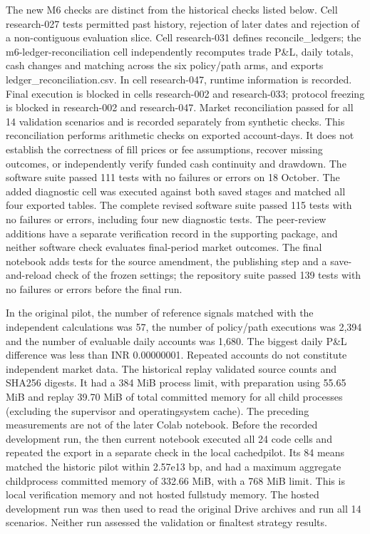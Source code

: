 \documentclass[11pt,a4paper]{article}
\begin{document}
The new M6 checks are distinct from the historical checks listed below. Cell research-027 tests permitted past history, rejection of later dates and rejection of a non-contiguous evaluation slice. Cell research-031 defines reconcile\_ledgers; the m6-ledger-reconciliation cell independently recomputes trade P\&L, daily totals, cash changes and matching across the six policy/path arms, and exports ledger\_reconciliation.csv. In cell research-047, runtime information is recorded. Final execution is blocked in cells research-002 and research-033; protocol freezing is blocked in research-002 and research-047. Market reconciliation passed for all 14 validation scenarios and is recorded separately from synthetic checks. This reconciliation performs arithmetic checks on exported account-days. It does not establish the correctness of fill prices or fee assumptions, recover missing outcomes, or independently verify funded cash continuity and drawdown. The software suite passed 111 tests with no failures or errors on 18 October. The added diagnostic cell was executed against both saved stages and matched all four exported tables. The complete revised software suite passed 115 tests with no failures or errors, including four new diagnostic tests. The peer-review additions have a separate verification record in the supporting package, and neither software check evaluates final-period market outcomes. The final notebook adds tests for the source amendment, the publishing step and a save-and-reload check of the frozen settings; the repository suite passed 139 tests with no failures or errors before the final run.

In the original pilot, the number of reference signals matched with the independent calculations was 57, the number of policy/path executions was 2,394 and the number of evaluable daily accounts was 1,680. The biggest daily P\&L difference was less than INR 0.00000001. Repeated accounts do not constitute independent market data. The historical replay validated source counts and SHA\allowbreak{}256 digests. It had a 384 MiB process limit, with preparation using 55.65 MiB and replay 39.70 MiB of total committed memory for all child processes (excluding the supervisor and operating\allowbreak{}system cache). The preceding measurements are not of the later Colab notebook. Before the recorded development run, the then current notebook executed all 24 code cells and repeated the export in a separate check in the local cached\allowbreak{}pilot. Its 84 means matched the historic pilot within 2.57e\allowbreak{}13 bp, and had a maximum aggregate child\allowbreak{}process committed memory of 332.66 MiB, with a 768 MiB limit. This is local verification memory and not hosted full\allowbreak{}study memory. The hosted development run was then used to read the original Drive archives and run all 14 scenarios. Neither run assessed the validation or final\allowbreak{}test strategy results.
\end{document}
